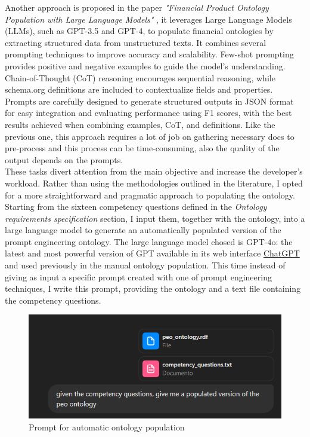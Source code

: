 Another approach is proposed in the paper \textit{"Financial Product Ontology Population with Large Language Models"} \cite{saetia2024financial}, it leverages Large Language Models (LLMs), such as GPT-3.5 and GPT-4, to populate financial ontologies by extracting structured data from unstructured texts. It combines several prompting techniques to improve accuracy and scalability. Few-shot prompting provides positive and negative examples to guide the model's understanding. Chain-of-Thought (CoT) reasoning encourages sequential reasoning, while schema.org definitions are included to contextualize fields and properties. Prompts are carefully designed to generate structured outputs in JSON format for easy integration and evaluating performance using F1 scores, with the best results achieved when combining examples, CoT, and definitions. Like the previous one, this approach requires a lot of job on gathering necessary docs to pre-process and this process can be time-consuming, also the quality of the output depends on the prompts.\\ These tasks divert attention from the main objective and increase the developer's workload. Rather than using the methodologies outlined in the literature, I opted for a more straightforward and pragmatic approach to populating the ontology. Starting from the sixteen competency questions defined in the \textit{Ontology requirements specification} section, I input them, together with the ontology, into a large language model to generate an automatically populated version of the prompt engineering ontology. The large language model chosed is GPT-4o: the latest and most powerful version of GPT available in its web interface \href{https://chatgpt.com/}{ChatGPT} and used previously in the manual ontology population. This time instead of giving as input a specific prompt created with one of prompt engineering techniques, I write this prompt, providing the ontology and a text file containing the competency questions.
\begin{figure}[H]
    \centering
    \includegraphics[width=0.9\linewidth]{Figures/fig_34.png}
    \caption{Prompt for automatic ontology population}
    \label{fig:enter-label}
\end{figure}
